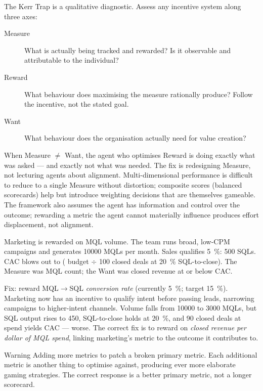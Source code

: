 The Kerr Trap is a qualitative diagnostic. Assess any incentive system along three axes:
\begin{description}
  \item[Measure] What is actually being tracked and rewarded? Is it observable and attributable to the individual?
  \item[Reward] What behaviour does maximising the measure rationally produce? Follow the incentive, not the stated goal.
  \item[Want] What behaviour does the organisation actually need for value creation?
\end{description}
When Measure $\ne$ Want, the agent who optimises Reward is doing exactly what was asked --- and exactly not what was needed. The fix is redesigning Measure, not lecturing agents about alignment. Multi-dimensional performance is difficult to reduce to a single Measure without distortion; composite scores (balanced scorecards) help but introduce weighting decisions that are themselves gameable. The framework also assumes the agent has information and control over the outcome; rewarding a metric the agent cannot materially influence produces effort displacement, not alignment.

\begin{example}
Marketing is rewarded on MQL volume. The team runs broad, low-CPM campaigns and generates \num{10000} MQLs per month. Sales qualifies \qty{5}{\percent}: \num{500} SQLs. CAC blows out to  ( budget $\div$ \num{100} closed deals at \qty{20}{\percent} SQL-to-close). The Measure was MQL count; the Want was closed revenue at or below  CAC.

Fix: reward MQL$\to$SQL \emph{conversion rate} (currently \qty{5}{\percent}; target \qty{15}{\percent}). Marketing now has an incentive to qualify intent before passing leads, narrowing campaigns to higher-intent channels. Volume falls from \num{10000} to \num{3000} MQLs, but SQL output rises to \num{450}, SQL-to-close holds at \qty{20}{\percent}, and \num{90} closed deals at  spend yields  CAC --- worse. The correct fix is to reward on \emph{closed revenue per dollar of MQL spend}, linking marketing's metric to the outcome it contributes to.
\end{example}

\begin{admonition}{Warning}
Adding more metrics to patch a broken primary metric. Each additional metric is another thing to optimise against, producing ever more elaborate gaming strategies. The correct response is a better primary metric, not a longer scorecard.
\end{admonition}

